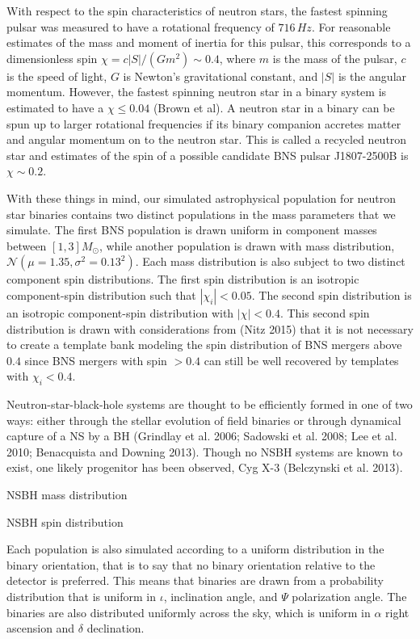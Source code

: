 With respect to the spin characteristics of neutron stars, the fastest spinning pulsar was measured to have a rotational frequency of $716 \, Hz$. For reasonable estimates of the mass and moment of inertia for this pulsar, this corresponds to a dimensionless spin $\chi = c |S| / (G m^2) \sim 0.4$, where $m$ is the mass of the pulsar, $c$ is the speed of light, $G$ is Newton's gravitational constant, and $|S|$ is the angular momentum. However, the fastest spinning neutron star in a binary system is estimated to have a $\chi \leq 0.04$ (Brown et al). A neutron star in a binary can be spun up to larger rotational frequencies if its binary companion accretes matter and angular momentum on to the neutron star. This is called a recycled neutron star and estimates of the spin of a possible candidate BNS pulsar J1807-2500B is $\chi \sim 0.2$.

With these things in mind, our simulated astrophysical population for neutron star binaries contains two distinct populations in the mass parameters that we simulate. The first BNS population is drawn uniform in component masses between $\left[1, 3\right] M_\odot$, while another population is drawn with mass distribution, $\mathcal{N} \left(\mu = 1.35, \sigma^2 = 0.13^2 \right)$. Each mass distribution is also subject to two distinct component spin distributions. The first spin distribution is an isotropic component-spin distribution such that $|\chi_i| < 0.05$. The second spin distribution is an isotropic component-spin distribution with $|\chi| < 0.4$. This second spin distribution is drawn with considerations from (Nitz 2015) that it is not necessary to create a template bank modeling the spin distribution of BNS mergers above $0.4$ since BNS mergers with spin $> 0.4$ can still be well recovered by templates with $\chi_i < 0.4$.

Neutron-star-black-hole systems are thought to be efficiently formed in one of two ways: either through the stellar evolution of field binaries or through dynamical capture of a NS by a BH (Grindlay et al. 2006; Sadowski et al. 2008; Lee et al. 2010; Benacquista and Downing 2013). Though no NSBH systems are known to exist, one likely progenitor has been observed, Cyg X-3 (Belczynski et al. 2013).

NSBH mass distribution

NSBH spin distribution

Each population is also simulated according to a uniform distribution in the binary orientation, that is to say that no binary orientation relative to the detector is preferred. This means that binaries are drawn from a probability distribution that is uniform in $\iota$, inclination angle, and $\Psi$ polarization angle. The binaries are also distributed uniformly across the sky, which is uniform in $\alpha$ right ascension and $\delta$ declination.

